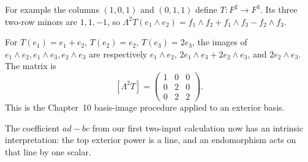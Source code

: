 For example the columns $(1,0,1)$ and $(0,1,1)$ define $T:F^2\to F^3$.
Its three two-row minors are $1,1,-1$, so
$\Lambda^2T(e_1\wedge e_2)=f_1\wedge f_2+f_1\wedge f_3-f_2\wedge f_3$.

\begin{example}
For $T(e_1)=e_1+e_2$, $T(e_2)=e_2$, $T(e_3)=2e_3$, the images of
$e_1\wedge e_2,e_1\wedge e_3,e_2\wedge e_3$ are respectively
$e_1\wedge e_2$, $2e_1\wedge e_3+2e_2\wedge e_3$, and
$2e_2\wedge e_3$. The matrix is
\[
[\Lambda^2T]=\begin{pmatrix}1&0&0\\0&2&0\\0&2&2\end{pmatrix}.
\]
This is the Chapter~10 basis-image procedure applied to an exterior basis.
\end{example}

The coefficient $ad-bc$ from our first two-input calculation now has an
intrinsic interpretation: the top exterior power is a line, and an
endomorphism acts on that line by one scalar.

